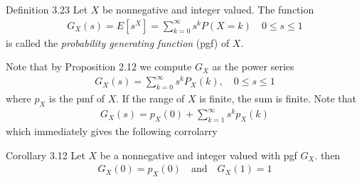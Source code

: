 


%
\begin{boks}{Definition 3.23}
  Let $X$ be nonnegative and integer valued. The function
  \begin{align*}
    G_X(s) = E[s^X] = \sum_{k=0}^\infty s^kP(X=k) \quad 0 \leq s \leq 1
  \end{align*}
  is called the \textit{probability generating function} (pgf) of $X$.
\end{boks}
Note that by Proposition 2.12 we compute $G_X$ as the power series
\begin{align*}
  G_X(s) = \sum_{k = 0}^\infty s^k P_X(k), \quad 0 \leq s \leq 1
\end{align*}
where $p_X$ is the pmf of $X$. If the range of $X$ is finite, the sum is finite. Note that
\begin{align*}
  G_X(s) = p_X(0) + \sum_{k = 1}^\infty s^k p_X(k)
\end{align*}
which immediately gives the following corrolarry
\begin{boks}{Corollary 3.12}
  Let $X$ be a nonnegative and integer valued with pgf $G_X$. then
  \begin{align*}
    G_X(0) = p_X(0) \quad \text{and} \quad G_X(1) = 1
  \end{align*}
\end{boks}
%

